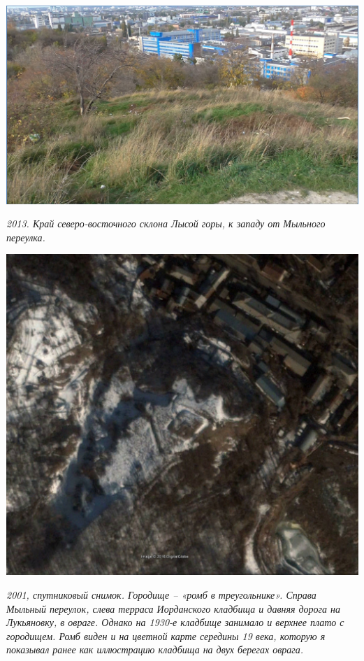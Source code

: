 \begin{center}
\includegraphics[width=\linewidth]{chast-kirvys/lys02/lg01.jpg}

\textit{2013. Край северо-восточного склона Лысой горы, к западу от Мыльного переулка.}
\end{center}
\vspace*{\fill}
\newpage

\newpage
\vspace*{\fill}
\begin{center}
\includegraphics[width=\linewidth]{chast-kirvys/lys02/romb.jpg}

\textit{2001, спутниковый снимок. Городище – «ромб в треугольнике». Справа Мыльный переулок, слева терраса Иорданского кладбища и давняя дорога на Лукьяновку, в овраге. Однако на 1930-е кладбище занимало и верхнее плато с городищем. Ромб виден и на цветной карте середины 19 века, которую я показывал ранее как иллюстрацию кладбища на двух берегах оврага.}
\end{center}
\vspace*{\fill}


